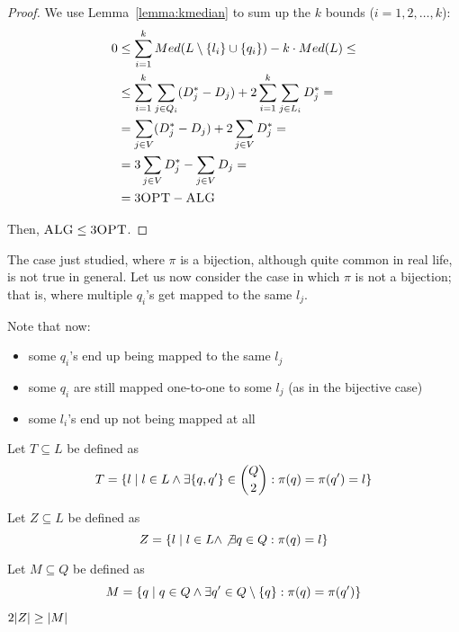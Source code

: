     \begin{proof}
        We use Lemma~\ref{lemma:kmedian} to sum up the $k$ bounds ($i = 1, 2, \dots, k$):
        \begin{equation*}
            \begin{split}
                0 &\leq \sum_{i=1}^{k} Med(L \setminus \{l_i\} \cup \{q_i\}) - k \cdot Med(L) \leq\\
                    &\leq \sum_{i=1}^{k} \sum_{j \in Q_i} (D_j^* - D_j) + 2 \sum_{i=1}^{k} \sum_{j \in L_i} D_j^* =\\
                    &= \sum_{j \in V} (D_j^* - D_j) + 2 \sum_{j \in V} D_j^* =\\
                    &= 3 \sum_{j \in V} D_j^* - \sum_{j \in V} D_j =\\
                    &= 3 \textsc{OPT} - \textsc{ALG}
            \end{split}
        \end{equation*}

        Then, $\textsc{ALG} \leq 3 \textsc{OPT}$.
    \end{proof}

    The case just studied, where $\pi$ is a bijection, although quite common in real life, is not true in general.
    Let us now consider the case in which $\pi$ is not a bijection; that is, where multiple $q_i$'s get mapped to the same $l_j$.

    Note that now:
    \begin{itemize}
        \item some $q_i$'s end up being mapped to the same $l_j$
        \item some $q_i$ are still mapped one-to-one to some $l_j$ (as in the bijective case)
        \item some $l_i$'s end up not being mapped at all
    \end{itemize}

    Let $T \subseteq L$ be defined as
    \[ T = \{ l \; \vert \; l \in L \wedge \exists \{q,q'\} \in \binom{Q}{2} : \pi(q) = \pi(q') = l \} \]

    Let $Z \subseteq L$ be defined as
    \[ Z = \{ l \; \vert \; l \in L \wedge \not\exists q \in Q : \pi(q) = l \} \]

    Let $M \subseteq Q$ be defined as
    \[ M = \{ q \; \vert \; q \in Q \wedge \exists q' \in Q \setminus \{q\} : \pi(q) = \pi(q') \} \]

    \begin{lemma}
        $2 \vert Z \vert \geq \vert M \vert$
    \end{lemma}

